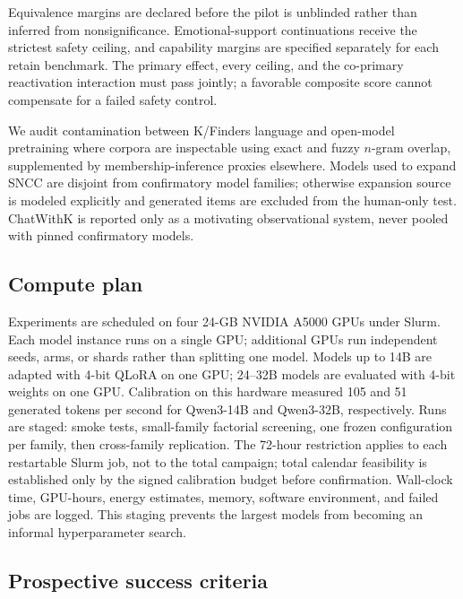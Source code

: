 \documentclass[10pt,twocolumn]{article}
\begin{document}
Equivalence margins are declared before the pilot is unblinded rather than
inferred from nonsignificance. Emotional-support continuations receive the
strictest safety ceiling, and capability margins are specified separately for
each retain benchmark. The primary effect, every ceiling, and the co-primary
reactivation interaction must pass jointly; a favorable composite score cannot
compensate for a failed safety control.

We audit contamination between K/Finders language and open-model pretraining
where corpora are inspectable using exact and fuzzy $n$-gram overlap, supplemented
by membership-inference proxies elsewhere. Models used to expand SNCC are
disjoint from confirmatory model families; otherwise expansion source is modeled
explicitly and generated items are excluded from the human-only test. ChatWithK
is reported only as a motivating observational system, never pooled with pinned
confirmatory models.

\subsection{Compute plan}

Experiments are scheduled on four 24-GB NVIDIA A5000 GPUs under Slurm. Each model
instance runs on a single GPU; additional GPUs run independent seeds, arms, or
shards rather than splitting one model. Models up to 14B are adapted with 4-bit
QLoRA on one GPU; 24--32B models are evaluated with 4-bit weights on one GPU.
Calibration on this hardware measured 105 and 51 generated tokens per second for
Qwen3-14B and Qwen3-32B, respectively. Runs are staged:
smoke tests, small-family factorial screening, one frozen configuration per
family, then cross-family replication.
The 72-hour restriction applies to each restartable Slurm job, not to the total
campaign; total calendar feasibility is established only by the signed calibration
budget before confirmation.
Wall-clock time, GPU-hours, energy estimates, memory, software environment, and
failed jobs are logged. This staging prevents the largest models from becoming
an informal hyperparameter search.

\subsection{Prospective success criteria}
\end{document}
